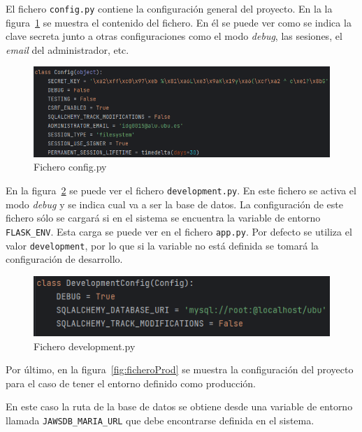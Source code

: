 El fichero \texttt{config.py} contiene la configuración general del proyecto. En la la figura~\ref{fig:ficheroConfig} se muestra el contenido del fichero. En él se puede ver como se indica la clave secreta junto a otras configuraciones como el modo \textit{debug}, las sesiones, el \textit{email} del administrador, etc.

\begin{figure}
	\centering
	\includegraphics[width=\textwidth]{../img/Anexos/ManualProgramador/config.png}
	\caption{Fichero config.py}\label{fig:ficheroConfig}
\end{figure}

En la figura~\ref{fig:ficheroDev} se puede ver el fichero \texttt{development.py}. 
En este fichero se activa el modo \textit{debug} y se indica cual va a ser la base de datos. 
La configuración de este fichero sólo se cargará si en el sistema se encuentra la variable de entorno \texttt{FLASK\_ENV}. 
Esta carga se puede ver en el fichero \texttt{app.py}. 
Por defecto se utiliza el valor \texttt{development}, por lo que si la variable no está definida se tomará la configuración de desarrollo.

\begin{figure}
	\centering
	\includegraphics[width=\textwidth]{../img/Anexos/ManualProgramador/development.png}
	\caption{Fichero development.py}\label{fig:ficheroDev}
\end{figure}

Por último, en la figura~\ref{fig:ficheroProd} se muestra la configuración del proyecto para el caso de tener el entorno definido como producción.

En este caso la ruta de la base de datos se obtiene desde una variable de entorno llamada \texttt{JAWSDB\_MARIA\_URL} que debe encontrarse definida en el sistema.

